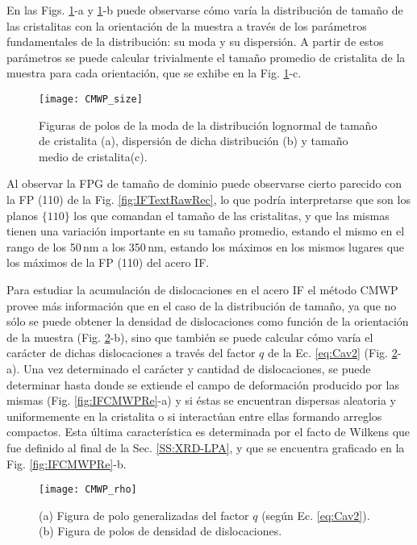 En las Figs. \ref{fig:IFCMWPSize}-a y \ref{fig:IFCMWPSize}-b puede observarse cómo varía la distribución de tamaño de las cristalitas con la orientación de la muestra a través de los parámetros fundamentales de la distribución: su moda y su dispersión.
A partir de estos parámetros se puede calcular trivialmente el tamaño promedio de cristalita de la muestra para cada orientación, que se exhibe en la Fig. \ref{fig:IFCMWPSize}-c.

\begin{figure}[!htb]
  \centering
  \texttt{[image: CMWP\_size]}
  \caption{Figuras de polos de la moda de la distribución lognormal de tamaño de cristalita (a), dispersión de dicha distribución (b) y tamaño medio de cristalita(c).}
  \label{fig:IFCMWPSize}
\end{figure}

Al observar la FPG de tamaño de dominio puede observarse cierto parecido con la FP (110) de la Fig. \ref{fig:IFTextRawRec}, lo que podría interpretarse que son los planos $\{110\}$ los que comandan el tamaño de las cristalitas, y que las mismas tienen una variación importante en su tamaño promedio, estando el mismo en el rango de los 50\,nm a los 350\,nm, estando los máximos en los mismos lugares que los máximos de la FP (110) del acero IF.

Para estudiar la acumulación de dislocaciones en el acero IF el método CMWP provee más información que en el caso de la distribución de tamaño, ya que no sólo se puede obtener la densidad de dislocaciones como función de la orientación de la muestra (Fig. \ref{fig:IFCMWPrho}-b), sino que también se puede calcular cómo varía el carácter de dichas dislocaciones a través del factor $q$ de la Ec. \ref{eq:Cav2} (Fig. \ref{fig:IFCMWPrho}-a).
Una vez determinado el carácter y cantidad de dislocaciones, se puede determinar hasta donde se extiende el campo de deformación producido por las mismas (Fig. \ref{fig:IFCMWPRe}-a) y si éstas se encuentran dispersas aleatoria y uniformemente en la cristalita o si interactúan entre ellas formando arreglos compactos.
Esta última característica es determinada por el facto de Wilkens que fue definido al final de la Sec. \ref{SS:XRD-LPA}, y que se encuentra graficado en la Fig. \ref{fig:IFCMWPRe}-b.

\begin{figure}[!htb]
  \centering
  \texttt{[image: CMWP\_rho]}
  \caption{(a) Figura de polo generalizadas del factor $q$ (según Ec. \ref{eq:Cav2}). (b) Figura de polos de densidad de dislocaciones.}
  \label{fig:IFCMWPrho}
\end{figure}

